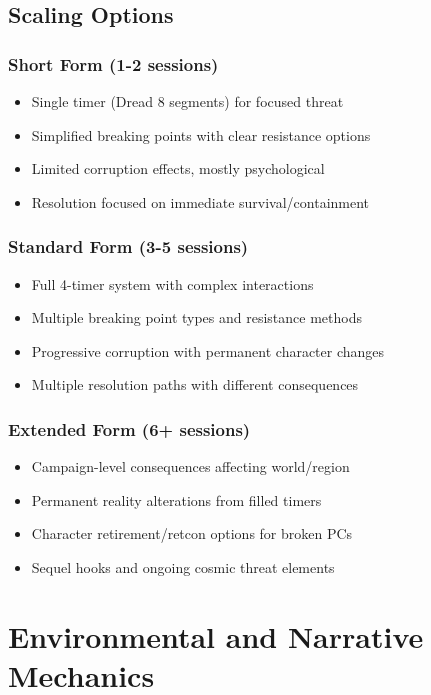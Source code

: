 \documentclass[11pt]{article}
\begin{document}
\subsection{Scaling Options}

\subsubsection{Short Form (1-2 sessions)}

\begin{itemize}
\item Single timer (Dread 8 segments) for focused threat
\item Simplified breaking points with clear resistance options
\item Limited corruption effects, mostly psychological
\item Resolution focused on immediate survival/containment
\end{itemize}

\subsubsection{Standard Form (3-5 sessions)}

\begin{itemize}
\item Full 4-timer system with complex interactions
\item Multiple breaking point types and resistance methods
\item Progressive corruption with permanent character changes
\item Multiple resolution paths with different consequences
\end{itemize}

\subsubsection{Extended Form (6+ sessions)}

\begin{itemize}
\item Campaign-level consequences affecting world/region
\item Permanent reality alterations from filled timers
\item Character retirement/retcon options for broken PCs
\item Sequel hooks and ongoing cosmic threat elements
\end{itemize}

\section{Environmental and Narrative Mechanics}
\end{document}
